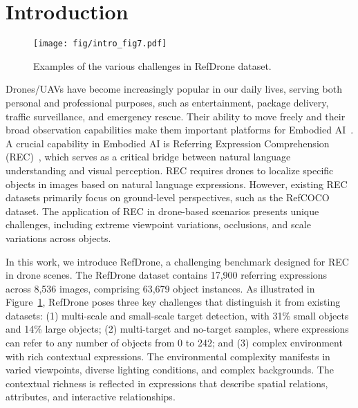 \section{Introduction}
\label{sec:intro}

\begin{figure}
    \centering
    \texttt{[image: fig/intro\_fig7.pdf]}
    \caption{Examples of the various challenges in RefDrone dataset.}
    \label{fig:intro-figure}
\end{figure}


Drones/UAVs have become increasingly popular in our daily lives, serving both personal and professional purposes, such as entertainment, package delivery, traffic surveillance, and emergency rescue. Their ability to move freely and their broad observation capabilities make them important platforms for Embodied AI~\cite{fan-etal-2023-aerial, liu2023aerialvln, lee2024citynav, gao2024embodied, liu2024coherent}. A crucial capability in Embodied AI is Referring Expression Comprehension (REC)~\cite{sima2023embodied, Wang_2024_CVPR, cai2024bridging, wang2024polaris}, which serves as a critical bridge between natural language understanding and visual perception. REC requires drones to localize specific objects in images based on natural language expressions. However, existing REC datasets primarily focus on ground-level perspectives, such as the RefCOCO~\cite{refcoco,refcocog} dataset. The application of REC in drone-based scenarios presents unique challenges, including extreme viewpoint variations, occlusions, and scale variations across objects.\par 

In this work, we introduce RefDrone, a challenging benchmark designed for REC in drone scenes. The RefDrone dataset contains 17,900 referring expressions across 8,536 images, comprising 63,679 object instances. As illustrated in Figure~\ref{fig:intro-figure}, RefDrone poses three key challenges that distinguish it from existing datasets: (1) multi-scale and small-scale target detection, with 31\% small objects and 14\% large objects; (2) multi-target and no-target samples, where expressions can refer to any number of objects from 0 to 242; and (3) complex environment with rich contextual expressions. The environmental complexity manifests in varied viewpoints, diverse lighting conditions, and complex backgrounds. The contextual richness is reflected in expressions that describe spatial relations, attributes, and interactive relationships. 



